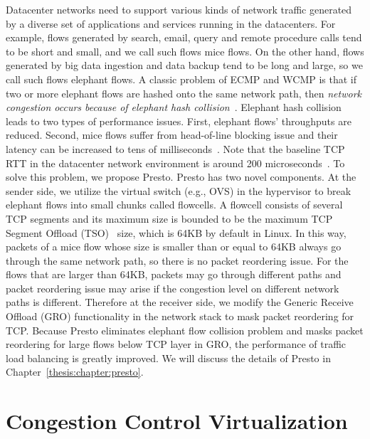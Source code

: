 Datacenter networks need to support various kinds of network traffic generated by 
a diverse set of applications and services running in the datacenters. For example, flows generated 
by search, email, query and remote procedure calls tend to be short and small, and we call such flows mice flows. 
On the other hand, flows generated by big data ingestion and data backup tend to be long and large, 
so we call such flows elephant flows. A classic problem of ECMP and WCMP is that if two or more elephant flows 
are hashed onto the same network path, then {\emph {network congestion occurs because of elephant 
hash collision}}~\cite{hedera,planck}.
Elephant hash collision leads to two types of performance issues. First, elephant flows' throughputs are reduced. 
Second, mice flows suffer from head-of-line blocking issue and their latency can be increased to 
tens of milliseconds~\cite{alizadeh2012less}. 
Note that the baseline TCP RTT in the datacenter network environment is around 200 microseconds~\cite{he2016ac}. 
To solve this problem, we propose Presto. Presto has two novel components. At the sender side, 
we utilize the virtual switch (e.g., OVS) in the hypervisor to break elephant flows into small chunks 
called flowcells. A flowcell consists of several TCP segments and its maximum size is bounded to be the 
maximum TCP Segment Offload (TSO)~\cite{tcp-segment-offload} size, 
which is 64KB by default in Linux. In this way, packets of a mice flow whose size 
is smaller than or equal to 64KB always go through the same network path, so there is no packet reordering issue. 
For the flows that are larger than 64KB, packets may go through different paths and packet reordering 
issue may arise if the congestion level on different network paths is different. 
Therefore at the receiver side, we modify the Generic Receive Offload (GRO) functionality in the network stack to 
mask packet reordering for TCP. Because Presto eliminates elephant flow collision problem and 
masks packet reordering for large flows below TCP layer in GRO, the performance of 
traffic load balancing is greatly improved.
We will discuss the details of Presto in Chapter~\ref{thesis:chapter:presto}.


\section{Congestion Control Virtualization}

